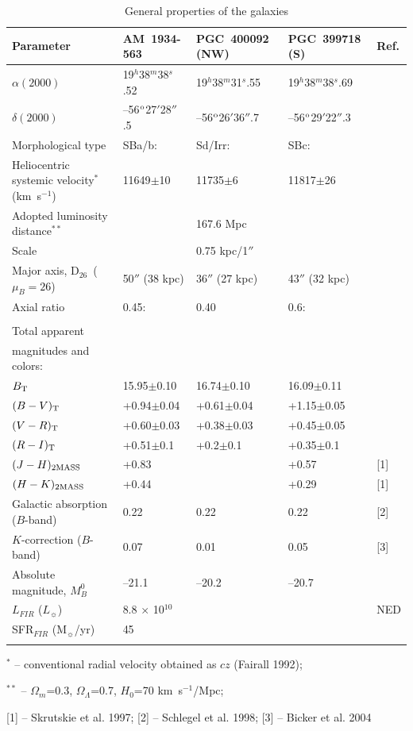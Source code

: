 \documentclass[]{aa}
\begin{document}
\begin{table}
\begin{tabular}{lllll}
\hline
\hline
Parameter &  AM~1934-563 & PGC~400092 (NW)  & PGC~399718 (S) & Ref. \\
\hline
$\alpha(2000)$     & 19$^h$38$^m$38$^s$.52 & 19$^h$38$^m$31$^s$.55 &19$^h$38$^m$38$^s$.69                   \\
$\delta(2000)$     & --56$^{\rm o}$27$'$28$''$.5 &--56$^{\rm o}$26$'$36$''$.7 &--56$^{\rm o}$29$'$22$''$.3                 \\
Morphological type             & SBa/b:    & Sd/Irr:   & SBc: &       \\
Heliocentric systemic velocity$^*$ (km~s$^{-1}$)& 11649$\pm$10 & 11735$\pm$6&11817$\pm$26 \\
Adopted luminosity distance$^{**}$  &            & 167.6 Mpc & &   \\
Scale                        &  & 0.75 kpc/1$''$    &\\
Major axis, D$_{26}$~($\mu_B=26$) & 50$''$ (38 kpc)& 36$''$ (27 kpc) & 43$''$ (32 kpc) &               \\
Axial ratio                  &0.45: & 0.40& 0.6:&             \\ \\
Total apparent                 &          & &&\\
magnitudes and colors:         &          & &&\\
$B_{\rm T}$         & 15.95$\pm$0.10 &  16.74$\pm$0.10 & 16.09$\pm$0.11 \\
$(B-V)_{\rm T}$     & +0.94$\pm$0.04 &  +0.61$\pm$0.04 & +1.15$\pm$0.05 \\
$(V-R)_{\rm T}$     & +0.60$\pm$0.03 &  +0.38$\pm$0.03 & +0.45$\pm$0.05 \\
$(R-I)_{\rm T}$     & +0.51$\pm$0.1 &   +0.2$\pm$0.1   & +0.35$\pm$0.1 \\
$(J-H)_{\rm 2MASS}$            & +0.83 & & +0.57 & [1]       \\
$(H-K)_{\rm 2MASS}$            & +0.44 & & +0.29 & [1]       \\
Galactic absorption ($B$-band) & 0.22  & 0.22    & 0.22 & [2] \\
$K$-correction ($B$-band)      & 0.07  & 0.01    & 0.05 & [3] \\
Absolute magnitude, $M_B^0$    & --21.1 & --20.2 & --20.7 & \\
$L_{FIR}$ ($L_{\sun}$)        & 8.8 $\times$ 10$^{10}$ & & & NED \\
SFR$_{FIR}$ (M$_{\sun}$/yr)   & 45  & & & \\
\hline \\
\end{tabular} 

$^*$ -- conventional radial velocity obtained as $cz$ (Fairall 1992);

$^{**}$ -- $\Omega_m$=0.3, $\Omega_{\Lambda}$=0.7, $H_0$=70 km~s$^{-1}$/Mpc;

[1] -- Skrutskie et al. 1997;
[2] -- Schlegel et al. 1998;
[3] -- Bicker et al. 2004

\caption{General properties of the galaxies}
\end{table}
\end{document}
